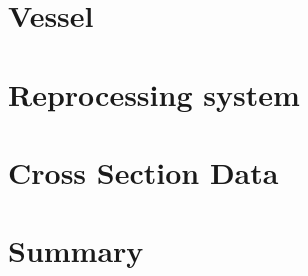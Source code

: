 \section{Vessel}
\label{sec:msbr-vessel}

\section{Reprocessing system}
\label{sec:msbr-reprocessing-system}

\section{Cross Section Data}

\section{Summary}

